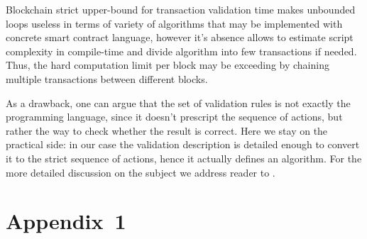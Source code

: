 \documentclass[runningheads]{llncs}
\begin{document}
    Blockchain strict upper-bound for transaction validation time makes unbounded
    loops useless in terms of variety of algorithms that may be implemented
    with concrete smart contract language, however it's absence allows to
    estimate script complexity in compile-time and divide algorithm into
    few transactions if needed. Thus, the hard computation limit per block
    may be exceeding by chaining multiple transactions between different blocks.

    As a drawback, one can argue that the set of validation rules is not exactly
    the programming language, since it doesn't prescript the sequence of actions,
    but rather the way to check whether the result is correct. Here we stay on the
    practical side: in our case the validation description is detailed enough to
    convert it to the strict sequence of actions, hence it actually defines an
    algorithm. For the more detailed discussion on the subject we address reader
    to .

    
    \section{Appendix~1}
    \label{appendix1}

\end{document}

